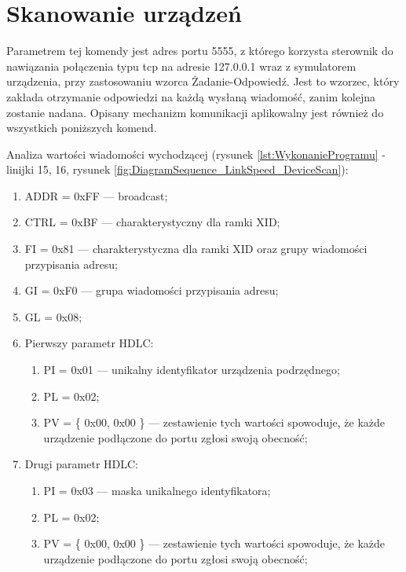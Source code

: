 \section{Skanowanie urządzeń}
Parametrem tej komendy jest adres portu 5555, z którego korzysta sterownik
do nawiązania połączenia typu tcp na adresie 127.0.0.1 wraz z symulatorem urządzenia,
przy zastosowaniu wzorca Żadanie-Odpowiedź. Jest to wzorzec, który zakłada otrzymanie odpowiedzi na każdą wysłaną wiadomość, zanim kolejna zostanie nadana. 
Opisany mechanizm komunikacji aplikowalny jest również do wszystkich poniższych komend.

Analiza wartości wiadomości wychodzącej 
(rysunek \ref{lst:WykonanieProgramu} - linijki {15, 16}, rysunek \ref{fig:DiagramSequence_LinkSpeed_DeviceScan}):
\begin{enumerate}
    \item ADDR = 0xFF --- broadcast;
    \item CTRL = 0xBF --- charakterystyczny dla ramki XID;
    \item FI = 0x81 --- charakterystyczna dla ramki XID oraz grupy wiadomości przypisania adresu;
    \item GI = 0xF0 --- grupa wiadomości przypisania adresu;
    \item GL = 0x08;
    \item Pierwszy parametr HDLC:
    \begin{enumerate}
        \item PI = 0x01 --- unikalny identyfikator urządzenia podrzędnego;
        \item PL = 0x02;
        \item PV = \{ 0x00, 0x00 \} --- zestawienie tych wartości spowoduje, że każde urządzenie podłączone do portu zgłosi swoją obecność;
    \end{enumerate}
    \item Drugi parametr HDLC:
    \begin{enumerate}
        \item PI = 0x03 --- maska unikalnego identyfikatora;
        \item PL = 0x02;
        \item PV = \{ 0x00, 0x00 \}  --- zestawienie tych wartości spowoduje, że każde urządzenie podłączone do portu zgłosi swoją obecność;
    \end{enumerate}
\end{enumerate}

